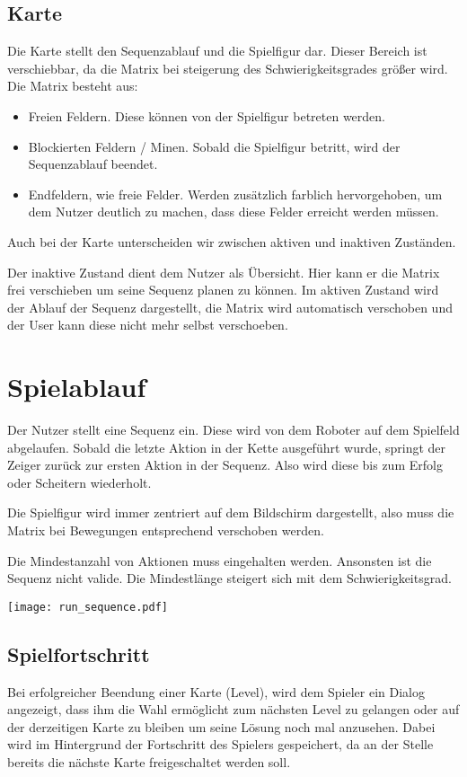 
\subsection{Karte}
Die Karte stellt den Sequenzablauf und die Spielfigur dar. Dieser Bereich ist
verschiebbar, da die Matrix bei steigerung des Schwierigkeitsgrades größer wird.
Die Matrix besteht aus:
\begin{itemize}
  \item Freien Feldern. Diese können von der Spielfigur betreten werden.
  \item Blockierten Feldern / Minen. Sobald die Spielfigur betritt, wird der
        Sequenzablauf beendet.
  \item Endfeldern, wie freie Felder. Werden zusätzlich farblich hervorgehoben,
        um dem Nutzer deutlich zu machen, dass diese Felder erreicht werden
        müssen.
\end{itemize}

Auch bei der Karte unterscheiden wir zwischen aktiven und inaktiven Zuständen.

Der inaktive Zustand dient dem Nutzer als Übersicht. Hier kann er die Matrix
frei verschieben um seine Sequenz planen zu können.
Im aktiven Zustand wird der Ablauf der Sequenz dargestellt, die Matrix wird
automatisch verschoben und der User kann diese nicht mehr selbst verschoeben.


\section{Spielablauf}
Der Nutzer stellt eine Sequenz ein. Diese wird von dem Roboter auf dem
Spielfeld abgelaufen. Sobald die letzte Aktion in der Kette ausgeführt wurde,
springt der Zeiger zurück zur ersten Aktion in der Sequenz. Also wird diese
bis zum Erfolg oder Scheitern wiederholt.

Die Spielfigur wird immer zentriert auf dem Bildschirm dargestellt, also muss
die Matrix bei Bewegungen entsprechend verschoben werden.

Die Mindestanzahl von Aktionen muss eingehalten werden. Ansonsten ist die
Sequenz nicht valide. Die Mindestlänge steigert sich mit dem
Schwierigkeitsgrad.

\texttt{[image: run\_sequence.pdf]}


\subsection{Spielfortschritt}
Bei erfolgreicher Beendung einer Karte (Level), wird dem Spieler ein Dialog
angezeigt, dass ihm die Wahl ermöglicht zum nächsten Level zu gelangen oder
auf der derzeitigen Karte zu bleiben um seine Lösung noch mal anzusehen.
Dabei wird im Hintergrund der Fortschritt des Spielers gespeichert, da an der
Stelle bereits die nächste Karte freigeschaltet werden soll.
